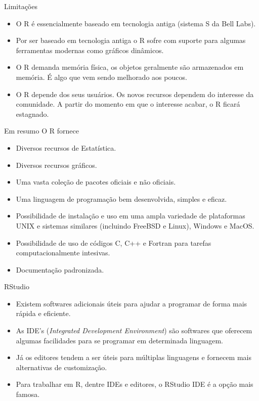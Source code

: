\documentclass[
  ignorenonframetext,
  serif,
  professionalfont,
  usenames,
  dvipsnames,
  aspectratio = 169]{beamer}
\providecommand{\tightlist}{%
  \setlength{\itemsep}{0pt}\setlength{\parskip}{0pt}}
\renewcommand{\tightlist}{%
  \setlength{\itemsep}{0\baselineskip}
  \setlength{\parskip}{0.25\baselineskip}
}
\begin{document}
\begin{frame}{Limitações}
\protect\hypertarget{limitauxe7uxf5es}{}
\begin{itemize}
\item
  O R é essencialmente baseado em tecnologia antiga (sistema S da Bell
  Labs).
\item
  Por ser baseado em tecnologia antiga o R sofre com suporte para
  algumas ferramentas modernas como gráficos dinâmicos.
\item
  O R demanda memória física, os objetos geralmente são armazenados em
  memória. É algo que vem sendo melhorado aos poucos.
\item
  O R depende dos seus usuários. Os novos recursos dependem do interesse
  da comunidade. A partir do momento em que o interesse acabar, o R
  ficará estagnado.
\end{itemize}
\end{frame}

\begin{frame}{Em resumo}
\protect\hypertarget{em-resumo}{}
O R fornece

\begin{itemize}
\tightlist
\item
  Diversos recursos de Estatística.
\item
  Diversos recursos gráficos.
\item
  Uma vasta coleção de pacotes oficiais e não oficiais.
\item
  Uma linguagem de programação bem desenvolvida, simples e eficaz.
\item
  Possibilidade de instalação e uso em uma ampla variedade de
  plataformas UNIX e sistemas similares (incluindo FreeBSD e Linux),
  Windows e MacOS.
\item
  Possibilidade de uso de códigos C, C++ e Fortran para tarefas
  computacionalmente intesivas.
\item
  Documentação padronizada.
\end{itemize}
\end{frame}

\begin{frame}{RStudio}
\protect\hypertarget{rstudio}{}
\begin{itemize}
\item
  Existem softwares adicionais úteis para ajudar a programar de forma
  mais rápida e eficiente.
\item
  As IDE's (\emph{Integrated Development Environment}) são softwares que
  oferecem algumas facilidades para se programar em determinada
  linguagem.
\item
  Já os editores tendem a ser úteis para múltiplas linguagens e fornecem
  mais alternativas de customização.
\item
  Para trabalhar em R, dentre IDEs e editores, o RStudio IDE é a opção
  mais famosa.
\end{itemize}
\end{frame}
\end{document}
